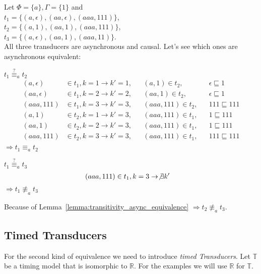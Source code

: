 \begin{exmp}[name = Asynchronous equivalence of Transducers]
  Let \(\Phi = \{a\}, \Gamma = \{1\}\) and \\
  \(t_1 = \{(a,\epsilon),(aa,\epsilon),(aaa,111)\}\), \\
  \(t_2 = \{(a,1),(aa,1),(aaa,111)\}\), \\
  \(t_3 = \{(a,\epsilon),(aa,1),(aaa,11)\}\).\\
  All three transducers are asynchronous and causal.
  Let's see which ones are asynchronous equivalent:

  \(t_1 \stackrel{?}{\equiv}_a t_2\)
  \begin{align*}
    (a,\epsilon)  &\in t_1, k = 1 \rightarrow k' = 1, &&(a,1)     \in t_2, &&\epsilon  \sqsubseteq 1 \\
    (aa,\epsilon) &\in t_1, k = 2 \rightarrow k' = 2, &&(aa,1)    \in t_2, &&\epsilon  \sqsubseteq 1 \\
    (aaa,111)     &\in t_1, k = 3 \rightarrow k' = 3, &&(aaa,111) \in t_2, &&111       \sqsubseteq 111 \\
    (a,1)         &\in t_2, k = 1 \rightarrow k' = 3, &&(aaa,111) \in t_1, &&1         \sqsubseteq 111 \\
    (aa,1)        &\in t_2, k = 2 \rightarrow k' = 3, &&(aaa,111) \in t_1, &&1         \sqsubseteq 111 \\
    (aaa,111)     &\in t_2, k = 3 \rightarrow k' = 3, &&(aaa,111) \in t_1, &&111       \sqsubseteq 111 \\
  \end{align*}
  \(\Rightarrow t_1 \equiv_a t_2\)

  \(t_1 \stackrel{?}{\equiv}_a t_3\)
  \begin{align*}
    (aaa,111)     &\in t_1, k = 3 \rightarrow \not\exists k'
  \end{align*}
  \(\Rightarrow t_1 \not\equiv_a t_3\)

  Because of Lemma~\ref{lemma:transitivity_async_equivalence} \(\Rightarrow t_2 \not\equiv_a t_3\).

\end{exmp}

\subsection{Timed Transducers}\label{sec:concepts:def:timed_transducer}

For the second kind of equivalence we need to introduce \emph{timed Transducers}.
Let \(\mathbb{T}\) be a timing model that is isomorphic to \(\mathbb{R}\).
For the examples we will use \(\mathbb{R}\) for \(\mathbb{T}\).\\

